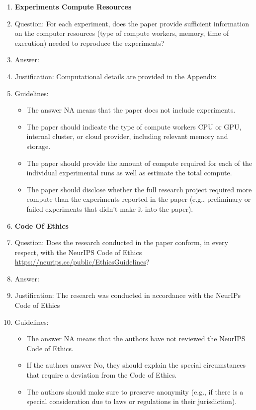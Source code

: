 \documentclass[letterpaper]{article}
\begin{document}
\begin{enumerate}
\item {\bf Experiments Compute Resources}
    \item[] Question: For each experiment, does the paper provide sufficient information on the computer resources (type of compute workers, memory, time of execution) needed to reproduce the experiments?
    \item[] Answer: \answerYes{} %
    \item[] Justification: Computational details are provided in the Appendix
    \item[] Guidelines:
    \begin{itemize}
        \item The answer NA means that the paper does not include experiments.
        \item The paper should indicate the type of compute workers CPU or GPU, internal cluster, or cloud provider, including relevant memory and storage.
        \item The paper should provide the amount of compute required for each of the individual experimental runs as well as estimate the total compute. 
        \item The paper should disclose whether the full research project required more compute than the experiments reported in the paper (e.g., preliminary or failed experiments that didn't make it into the paper). 
    \end{itemize}
    
\item {\bf Code Of Ethics}
    \item[] Question: Does the research conducted in the paper conform, in every respect, with the NeurIPS Code of Ethics \url{https://neurips.cc/public/EthicsGuidelines}?
    \item[] Answer: \answerYes{} %
    \item[] Justification: The research was conducted in accordance with the NeurIPs Code of Ethics
    \item[] Guidelines:
    \begin{itemize}
        \item The answer NA means that the authors have not reviewed the NeurIPS Code of Ethics.
        \item If the authors answer No, they should explain the special circumstances that require a deviation from the Code of Ethics.
        \item The authors should make sure to preserve anonymity (e.g., if there is a special consideration due to laws or regulations in their jurisdiction).
    \end{itemize}



\end{enumerate}
\end{document}
